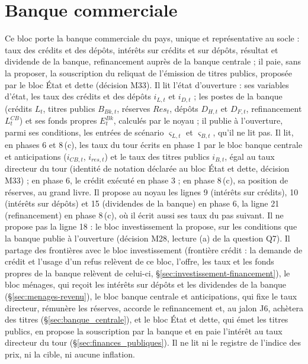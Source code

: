 \documentclass[11pt,a4paper]{article}
\begin{document}
\section{Banque commerciale}
\label{sec:banque}
Ce bloc porte la banque commerciale du pays, unique et représentative au socle : taux des crédits et des dépôts, intérêts sur crédits et sur dépôts, résultat et dividende de la banque, refinancement auprès de la banque centrale ; il paie, sans la proposer, la souscription du reliquat de l'émission de titres publics, proposée par le bloc État et dette (décision M33). Il lit l'état d'ouverture : ses variables d'état, les taux des crédits et des dépôts $i_{L,t}$ et $i_{D,t}$ ; les postes de la banque (crédits $L_t$, titres publics $B_{\mathit{Bk},t}$, réserves $\mathit{Res}_t$, dépôts $D_{H,t}$ et $D_{F,t}$, refinancement $L^{\mathit{CB}}_t$) et ses fonds propres $E^{\mathit{Bk}}_t$, calculés par le noyau ; il publie à l'ouverture, parmi ses conditions, les entrées de scénario $\varsigma_{L,t}$ et $\varsigma_{B,t}$, qu'il ne lit pas. Il lit, en phases 6 et 8\,(c), les taux du tour écrits en phase 1 par le bloc banque centrale et anticipations ($i_{\mathit{CB},t}$, $i_{\mathit{res},t}$) et le taux des titres publics $i_{B,t}$, égal au taux directeur du tour (identité de notation déclarée au bloc État et dette, décision M33) ; en phase 6, le crédit exécuté en phase 3 ; en phase 8\,(c), sa position de réserves, au grand livre. Il propose au noyau les lignes 9 (intérêts sur crédits), 10 (intérêts sur dépôts) et 15 (dividendes de la banque) en phase 6, la ligne 21 (refinancement) en phase 8\,(c), où il écrit aussi ses taux du pas suivant. Il ne propose pas la ligne 18 : le bloc investissement la propose, sur les conditions que la banque publie à l'ouverture (décision M28, lecture (a) de la question Q7). Il partage des frontières avec le bloc investissement (frontière crédit : la demande de crédit et l'usage d'un refus relèvent de ce bloc, l'offre, les taux et les fonds propres de la banque relèvent de celui-ci, \S\ref{sec:investissement-financement}), le bloc ménages, qui reçoit les intérêts sur dépôts et les dividendes de la banque (\S\ref{sec:menages-revenu}), le bloc banque centrale et anticipations, qui fixe le taux directeur, rémunère les réserves, accorde le refinancement et, au jalon J6, achètera des titres (\S\ref{sec:banque_centrale}), et le bloc État et dette, qui émet les titres publics, en propose la souscription par la banque et en paie l'intérêt au taux directeur du tour (\S\ref{sec:finances_publiques}). Il ne lit ni le registre de l'indice des prix, ni la cible, ni aucune inflation.
\end{document}
